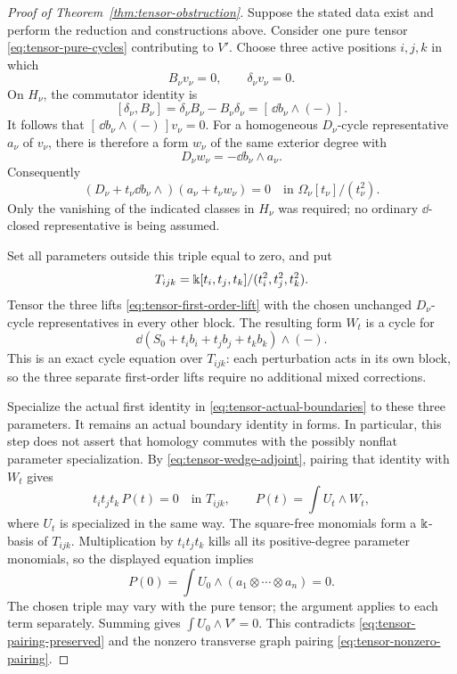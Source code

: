 \begin{proof}[Proof of Theorem~\ref{thm:tensor-obstruction}]
Suppose the stated data exist and perform the reduction and constructions
above.  Consider one pure tensor \eqref{eq:tensor-pure-cycles} contributing
to \(V'\).  Choose three active positions \(i,j,k\) in which
\[
                   B_\nu v_\nu=0,\qquad\delta_\nu v_\nu=0 .
\]
On \(H_\nu\), the commutator identity is
\[
       [\delta_\nu,B_\nu]
         =\delta_\nu B_\nu-B_\nu\delta_\nu
         =[\,\dd b_\nu\wedge(-)\,].
\]
It follows that \([\,\dd b_\nu\wedge(-)\,]v_\nu=0\).
For a homogeneous \(D_\nu\)-cycle representative \(a_\nu\) of \(v_\nu\),
there is therefore a form \(w_\nu\) of the same exterior degree with
\[
                    D_\nu w_\nu=-\dd b_\nu\wedge a_\nu .
\]
Consequently
\begin{equation}\label{eq:tensor-first-order-lift}
 (D_\nu+t_\nu\dd b_\nu\wedge)
                      (a_\nu+t_\nu w_\nu)=0
             \quad\text{in }\Omega_\nu[t_\nu]/(t_\nu^2).
\end{equation}
Only the vanishing of the indicated classes in \(H_\nu\) was required;
no ordinary \(\dd\)-closed representative is being assumed.

Set all parameters outside this triple equal to zero, and put
\[
 T_{ijk}=\Bbbk[t_i,t_j,t_k]/(t_i^2,t_j^2,t_k^2).
\]
Tensor the three lifts \eqref{eq:tensor-first-order-lift} with the chosen
unchanged \(D_\nu\)-cycle representatives in every other block.
The resulting form \(W_t\) is a cycle for
\[
              \dd(S_0+t_i b_i+t_j b_j+t_k b_k)\wedge(-).
\]
This is an exact cycle equation over \(T_{ijk}\): each perturbation acts
in its own block, so the three separate first-order lifts require no
additional mixed corrections.

Specialize the actual first identity in
\eqref{eq:tensor-actual-boundaries} to these three parameters.
It remains an actual boundary identity in forms.  In particular, this
step does not assert that homology commutes with the possibly nonflat
parameter specialization.
By \eqref{eq:tensor-wedge-adjoint}, pairing that identity with \(W_t\)
gives
\[
 t_i t_j t_k\,P(t)=0\quad\text{in }T_{ijk},\qquad
 P(t)=\int U_t\wedge W_t ,
\]
where \(U_t\) is specialized in the same way.
The square-free monomials form a \(\Bbbk\)-basis of \(T_{ijk}\).
Multiplication by \(t_i t_j t_k\) kills all its positive-degree
parameter monomials, so the displayed equation implies
\[
  P(0)=\int U_0\wedge(a_1\otimes\cdots\otimes a_n)=0 .
\]
The chosen triple may vary with the pure tensor; the argument applies
to each term separately.  Summing gives \(\int U_0\wedge V'=0\).
This contradicts \eqref{eq:tensor-pairing-preserved} and the nonzero
transverse graph pairing \eqref{eq:tensor-nonzero-pairing}.
\end{proof}
